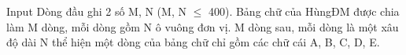 Input
Dòng đầu ghi 2 số M, N (M, N  $\le$  400). Bảng chữ của HùngĐM được chia làm M dòng, mỗi dòng gồm N ô vuông đơn vị. M dòng sau, mỗi dòng là một xâu độ dài N thể hiện một dòng của bảng chữ chỉ gồm các chữ cái A, B, C, D, E.